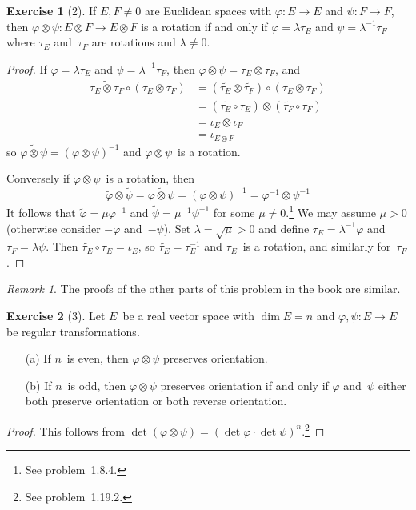 \documentclass[letterpaper,12pt]{article}
\newcommand{\after}{\circ}
\newcommand{\mult}{\cdot}
\newcommand{\tprod}{\otimes}
\newcommand{\adj}[1]{\widetilde{#1}}
\theoremstyle{definition}
\newtheorem*{exer}{Exercise}
\theoremstyle{remark}
\newtheorem*{rmk}{Remark}
\begin{document}
\begin{exer}[2]
If \(E,F\ne 0\) are Euclidean spaces with \(\varphi:E\to E\) and \(\psi:F\to F\), then \(\varphi\tprod\psi:E\tprod F\to E\tprod F\) is a rotation if and only if \(\varphi=\lambda\tau_E\) and \(\psi=\lambda^{-1}\tau_F\) where \(\tau_E\) and~\(\tau_F\) are rotations and \(\lambda\ne 0\).
\end{exer}
\begin{proof}
If \(\varphi=\lambda\tau_E\) and \(\psi=\lambda^{-1}\tau_F\), then \(\varphi\tprod\psi=\tau_E\tprod\tau_F\), and
\begin{align*}
\adj{\tau_E\tprod\tau_F}\after(\tau_E\tprod\tau_F)&=(\adj{\tau_E}\tprod\adj{\tau_F})\after(\tau_E\tprod\tau_F)\\
	&=(\adj{\tau_E}\after\tau_E)\tprod(\adj{\tau_F}\after\tau_F)\\
	&=\iota_E\tprod\iota_F\\
	&=\iota_{E\tprod F}
\end{align*}
so \(\adj{\varphi\tprod\psi}=(\varphi\tprod\psi)^{-1}\) and \(\varphi\tprod\psi\)~is a rotation.

Conversely if \(\varphi\tprod\psi\)~is a rotation, then
\[\adj{\varphi}\tprod\adj{\psi}=\adj{\varphi\tprod\psi}=(\varphi\tprod\psi)^{-1}=\varphi^{-1}\tprod\psi^{-1}\]
It follows that \(\adj{\varphi}=\mu\varphi^{-1}\) and \(\adj{\psi}=\mu^{-1}\psi^{-1}\) for some \(\mu\ne 0\).\footnote{See problem~1.8.4.} We may assume \(\mu>0\) (otherwise consider \(-\varphi\) and~\(-\psi\)). Set \(\lambda=\sqrt{\mu}>0\) and define \(\tau_E=\lambda^{-1}\varphi\) and \(\tau_F=\lambda\psi\). Then \(\adj{\tau_E}\after\tau_E=\iota_E\), so \(\adj{\tau_E}=\tau_E^{-1}\) and \(\tau_E\)~is a rotation, and similarly for~\(\tau_F\).
\end{proof}
\begin{rmk}
The proofs of the other parts of this problem in the book are similar.
\end{rmk}

\begin{exer}[3]
Let \(E\)~be a real vector space with \(\dim E=n\) and \(\varphi,\psi:E\to E\) be regular transformations.
\begin{enumerate}
\item[(a)] If \(n\)~is even, then \(\varphi\tprod\psi\) preserves orientation.
\item[(b)] If \(n\)~is odd, then \(\varphi\tprod\psi\) preserves orientation if and only if \(\varphi\) and~\(\psi\) either both preserve orientation or both reverse orientation.
\end{enumerate}
\end{exer}
\begin{proof}
This follows from \(\det(\varphi\tprod\psi)=(\det\varphi\mult\det\psi)^n\).\footnote{See problem~1.19.2.}
\end{proof}
\end{document}
